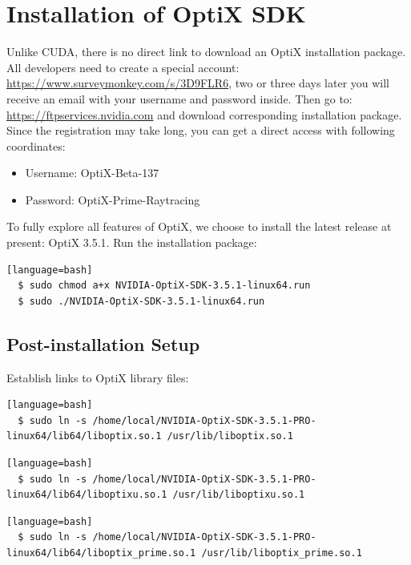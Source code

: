 \section{Installation of OptiX SDK}
Unlike CUDA, there is no direct link to download an OptiX installation package. All developers need to create a special account: \href{https://www.surveymonkey.com/s/3D9FLR6}{https://www.surveymonkey.com/s/3D9FLR6}, two or three days later you will receive an email with your username and password inside. Then go to: \href{https://ftpservices.nvidia.com}{https://ftpservices.nvidia.com} and download corresponding installation package. Since the registration may take long, you can get a direct access with following coordinates:
\begin{itemize}
  \bf
  \item Username: OptiX-Beta-137
  \item Password: OptiX-Prime-Raytracing
\end{itemize}
To fully explore all features of OptiX, we choose to install the latest release at present: OptiX 3.5.1. Run the installation package:
\begin{lstlisting}[style=DOS][language=bash]
  $ sudo chmod a+x NVIDIA-OptiX-SDK-3.5.1-linux64.run
  $ sudo ./NVIDIA-OptiX-SDK-3.5.1-linux64.run
\end{lstlisting}

\subsection{Post-installation Setup}
Establish links to OptiX library files:
\begin{lstlisting}[style=DOS][language=bash]
  $ sudo ln -s /home/local/NVIDIA-OptiX-SDK-3.5.1-PRO-linux64/lib64/liboptix.so.1 /usr/lib/liboptix.so.1
\end{lstlisting}
\begin{lstlisting}[style=DOS][language=bash]
  $ sudo ln -s /home/local/NVIDIA-OptiX-SDK-3.5.1-PRO-linux64/lib64/liboptixu.so.1 /usr/lib/liboptixu.so.1 
\end{lstlisting}
\begin{lstlisting}[style=DOS][language=bash]
  $ sudo ln -s /home/local/NVIDIA-OptiX-SDK-3.5.1-PRO-linux64/lib64/liboptix_prime.so.1 /usr/lib/liboptix_prime.so.1 
\end{lstlisting}


